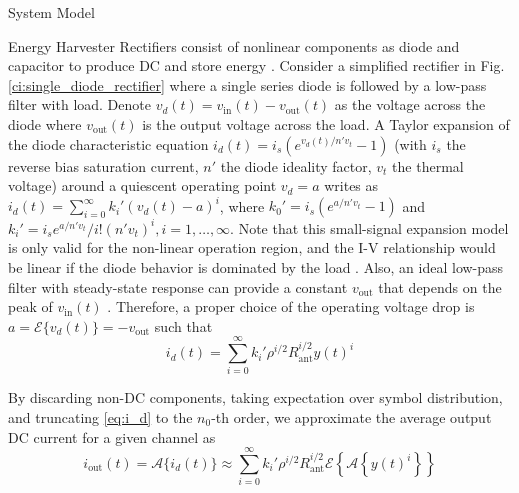 \documentclass[journal]{IEEEtran}
\begin{document}
\begin{section}{System Model}
\begin{subsection}{Energy Harvester}
		Rectifiers consist of nonlinear components as diode and capacitor to produce DC and store energy \cite{Hagerty2004,Pinuela2013}. Consider a simplified rectifier in Fig. \ref{ci:single_diode_rectifier} where a single series diode is followed by a low-pass filter with load. Denote $v_d(t)=v_{\text{in}}(t)-v_{\text{out}}(t)$ as the voltage across the diode where $v_{\text{out}}(t)$ is the output voltage across the load. A Taylor expansion of the diode characteristic equation $i_d(t)=i_s(e^{v_d(t)/n' v_t}-1)$ (with $i_s$ the reverse bias saturation current, $n'$ the diode ideality factor, $v_t$ the thermal voltage) around a quiescent operating point $v_d=a$ writes as $i_d(t)=\sum_{i=0}^{\infty}k_i'(v_d(t)-a)^i$, where $k_0'=i_s(e^{a/n' v_t}-1)$ and $k_i'=i_se^{a/n'v_t}/i!(n'v_t)^i,i=1,\dots,\infty$. Note that this small-signal expansion model is only valid for the non-linear operation region, and the I-V relationship would be linear if the diode behavior is dominated by the load \cite{Clerckx2016a}. Also, an ideal low-pass filter with steady-state response can provide a constant $v_{\text{out}}$ that depends on the peak of $v_{\text{in}}(t)$ \cite{Curty2005}. Therefore, a proper choice of the operating voltage drop is $a=\mathcal{E}\{v_d(t)\}=-v_{\text{out}}$ such that
		\begin{equation}\label{eq:i_d}
			i_d(t)=\sum_{i=0}^{\infty}k_i'\rho^{i/2}R_{\text{ant}}^{i/2}y(t)^i
		\end{equation}

		By discarding non-DC components, taking expectation over symbol distribution, and truncating \ref{eq:i_d} to the $n_0$-th order, we approximate the average output DC current for a given channel as
		\begin{equation}\label{eq:i_out}
			i_{\text{out}}(t)=\mathcal{A}\{i_d(t)\}\approx\sum_{i=0}^{\infty}{k_i'}{\rho^{i/2}}{R_{\text{ant}}^{i/2}}\mathcal{E}\left\{{\mathcal{A}\left\{y(t)^i\right\}}\right\}
		\end{equation}


\end{subsection}
\end{section}
\end{document}
